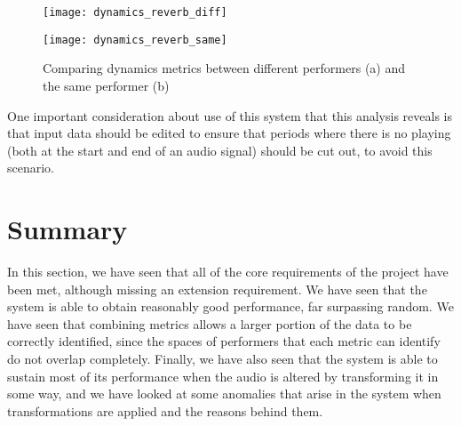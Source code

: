 \documentclass[oneside, class=book, 12pt, crop=false]{standalone}
\begin{document}
\begin{figure}[h]

  \captionsetup{justification=centering}
  \begin{minipage}{0.5\textwidth}
    \centering
    \texttt{[image: dynamics\_reverb\_diff]}
    \subcaption{}
  \end{minipage}%
  \begin{minipage}{0.5\textwidth}
    \centering
    \texttt{[image: dynamics\_reverb\_same]}
    \subcaption{}
  \end{minipage}

  \caption{Comparing dynamics metrics between different performers (a) and the same performer (b)}
  \label{fig:dynamics reverb tails}
\end{figure}

One important consideration about use of this system that this analysis reveals is that input data should be edited to ensure that periods where there is no playing (both at the start and end of an audio signal) should be cut out, to avoid this scenario. 


\section{Summary}

In this section, we have seen that all of the core requirements of the project have been met, although missing an extension requirement. We have seen that the system is able to obtain reasonably good performance, far surpassing random. We have seen that combining metrics allows a larger portion of the data to be correctly identified, since the spaces of performers that each metric can identify do not overlap completely. Finally, we have also seen that the system is able to sustain most of its performance when the audio is altered by transforming it in some way, and we have looked at some anomalies that arise in the system when transformations are applied and the reasons behind them.












\ifstandalone
  \printbibliography
\fi
    
\end{document}
